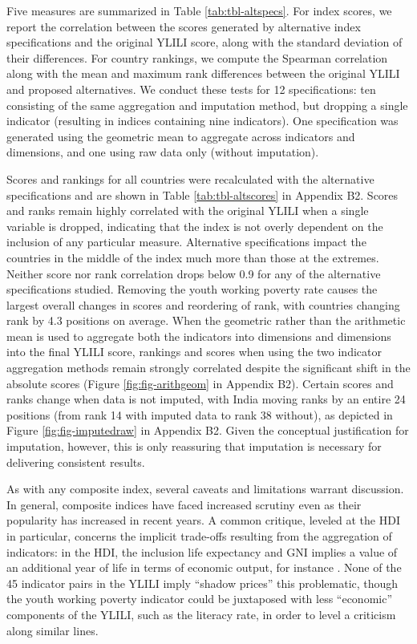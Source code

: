 \documentclass[
  a4paper, twoside, 12pt]{book}
\begin{document}
Five measures are summarized in Table \ref{tab:tbl-altspecs}. For index scores, we report the correlation between the scores generated by alternative index specifications and the original YLILI score, along with the standard deviation of their differences. For country rankings, we compute the Spearman correlation along with the mean and maximum rank differences between the original YLILI and proposed alternatives. We conduct these tests for 12 specifications: ten consisting of the same aggregation and imputation method, but dropping a single indicator (resulting in indices containing nine indicators). One specification was generated using the geometric mean to aggregate across indicators and dimensions, and one using raw data only (without imputation).



Scores and rankings for all countries were recalculated with the alternative specifications and are shown in Table \ref{tab:tbl-altscores} in Appendix B2. Scores and ranks remain highly correlated with the original YLILI when a single variable is dropped, indicating that the index is not overly dependent on the inclusion of any particular measure. Alternative specifications impact the countries in the middle of the index much more than those at the extremes. Neither score nor rank correlation drops below 0.9 for any of the alternative specifications studied. Removing the youth working poverty rate causes the largest overall changes in scores and reordering of rank, with countries changing rank by 4.3 positions on average. When the geometric rather than the arithmetic mean is used to aggregate both the indicators into dimensions and dimensions into the final YLILI score, rankings and scores when using the two indicator aggregation methods remain strongly correlated despite the significant shift in the absolute scores (Figure \ref{fig:fig-arithgeom} in Appendix B2). Certain scores and ranks change when data is not imputed, with India moving ranks by an entire 24 positions (from rank 14 with imputed data to rank 38 without), as depicted in Figure \ref{fig:fig-imputedraw} in Appendix B2. Given the conceptual justification for imputation, however, this is only reassuring that imputation is necessary for delivering consistent results.

As with any composite index, several caveats and limitations warrant discussion. In general, composite indices have faced increased scrutiny even as their popularity has increased in recent years. A common critique, leveled at the HDI in particular, concerns the implicit trade-offs resulting from the aggregation of indicators: in the HDI, the inclusion life expectancy and GNI implies a value of an additional year of life in terms of economic output, for instance \autocite{ravallion2012}. None of the 45 indicator pairs in the YLILI imply ``shadow prices'' this problematic, though the youth working poverty indicator could be juxtaposed with less ``economic'' components of the YLILI, such as the literacy rate, in order to level a criticism along similar lines.
\end{document}
